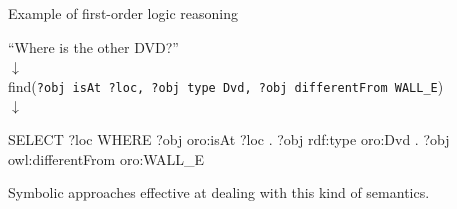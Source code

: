 \documentclass[compress,xcolor=table]{beamer}
\begin{document}

\begin{frame}[fragile]{Example of first-order logic reasoning}
    \centering

    \vspace*{2em}
    ``Where is the other DVD?''\\
    $\downarrow$\\
    find({\tt\scriptsize ?obj isAt ?loc, ?obj type Dvd, ?obj differentFrom WALL\_E})\\
    $\downarrow$\\

    \begin{sparqlcode}
    SELECT ?loc
    WHERE {
        ?obj oro:isAt ?loc .
        ?obj rdf:type oro:Dvd .
        ?obj owl:differentFrom oro:WALL_E
    }
    \end{sparqlcode}

    

    \pause

    Symbolic approaches effective at dealing with this kind of semantics.

\end{frame}
\end{document}
